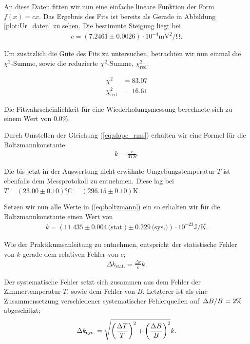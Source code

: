 An diese Daten fitten wir nun eine einfache lineare Funktion der Form $f(x) = cx$. Das Ergebnis des Fits ist bereits als Gerade in Abbildung \ref{plot:Ur_daten} zu sehen. Die bestimmte Steigung liegt bei
\begin{align}
  c = (7.2461 \pm 0.0026) \cdot 10^{-4} \si{\milli\volt\squared\per\ohm}.
\end{align}

Um zusätzlich die Güte des Fits zu untersuchen, betrachten wir nun einmal die $\chi^2$-Summe, sowie die reduzierte $\chi^2$-Summe, $\chi^2_\text{red}$.

\begin{align}
  \chi^2 &= 83.07\\
  \chi^2_\text{red} &= 16.61
\end{align}

Die Fitwahrscheinlichkeit für eine Wiederholungsmessung berechnete sich zu einem Wert von $0.0$\%.

Durch Umstellen der Gleichung (\ref{eq:slope_rms}) erhalten wir eine Formel für die Boltzmannkonstante
\begin{align}
  k = \frac{c}{4 T B}. \label{eq:boltzmann}
\end{align}

Die bis jetzt in der Auswertung nicht erwähnte Umgebungstemperatur $T$ ist ebenfalls dem Messprotokoll zu entnehmen. Diese lag bei $T = (23.00 \pm 0.10) \si{\degreeCelsius}= (296.15 \pm 0.10) \si{\kelvin}$.

Setzen wir nun alle Werte in (\ref{eq:boltzmann}) ein so erhalten wir für die Boltzmannkonstante einen Wert von 
\begin{align}
  k = (11.435 \pm 0.004\, \text{(stat.)} \pm 0.229\, \text{(sys.)}) \cdot 10^{-23} \si{\joule\per\kelvin}.
\end{align}

Wie der Praktikumsanleitung zu entnehmen, entspricht der statistische Fehler von $k$ gerade dem relativen Fehler von $c$;
\begin{align}
  \Delta k_{\text{stat.}} = \frac{\Delta c}{c} k.
\end{align}

Der systematische Fehler setzt sich zusammen aus dem Fehler der Zimmertemperatur $T$, sowie dem Fehler von $B$. Letzterer ist als eine Zusammensetzung verschiedener systematischer Fehlerquellen auf $\flatfrac{\Delta B}{B} = 2 \%$ abgeschätzt;
\begin{align}
  \Delta k_{\text{sys.}} = \sqrt{\qty(\frac{\Delta T}{T})^2 + \qty(\frac{\Delta B}{B})^2} k.
\end{align}